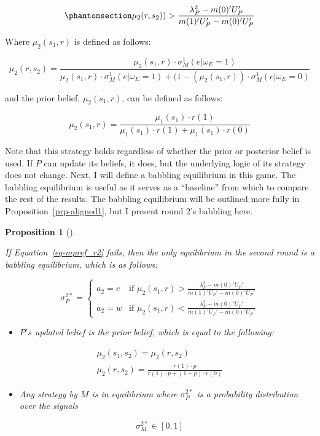 \documentclass[
  12pt,
]{article}
\providecommand{\tightlist}{%
  \setlength{\itemsep}{0pt}\setlength{\parskip}{0pt}}\usepackage{longtable,booktabs,array}
\theoremstyle{plain}
\theoremstyle{plain}
\newtheorem{proposition}{Proposition}[section]
\theoremstyle{remark}
\begin{document}
\begin{equation}\phantomsection\label{eq-cutpoint2}{
\mu_2 (r, s_2)) > \frac{\lambda^2_P - m(0)' U_P '}{m(1)' U_P' - m(0)' U_P'}
}\end{equation}

Where \(\mu_2(s_1, r)\) is defined as follows:

\[
\mu_2(r, s_2)= \frac{\mu_2(s_1, r) \cdot \sigma_M^1(e|\omega_E = 1)}{\mu_2(s_1, r) \cdot \sigma_M^1(e|\omega_E = 1) + (1 - (\mu_2(s_1, r)) \cdot \sigma_M^1(e|\omega_E = 0)}
\]

and the prior belief, \(\mu_2(s_1, r)\), can be defined as follows:

\[
\mu_2(s_1, r) = \frac{\mu_1(s_1) \cdot r(1)}{\mu_1(s_1) \cdot r(1) + \mu_1(s_1) \cdot r(0)}
\]

Note that this strategy holds regardless of whether the prior or
posterior belief is used. If \(P\) can update its beliefs, it does, but
the underlying logic of its strategy does not change. Next, I will
define a babbling equilibrium in this game. The babbling equilibrium is
useful as it serves as a ``baseline'' from which to compare the rest of
the results. The babbling equilibrium will be outlined more fully in
Proposition~\ref{prp-aligned1}, but I present round 2's babbling here.

\begin{proposition}[]\protect\hypertarget{prp-unalign2}{}\label{prp-unalign2}

If Equation~\ref{eq-mpref_r2} fails, then the only equilibrium in the
second round is a babbling equilibrium, which is as follows:

\[
\sigma_P^{2*} = 
\begin{cases} 
a_2 = e & \text{if } \mu_2(s_1, r) > \frac{\lambda^2_P - m(0)' U_P '}{m(1)' U_P' - m(0)' U_P'}\\
a_2 = w & \text{if } \mu_2(s_1, r) < \frac{\lambda^2_P - m(0)' U_P '}{m(1)' U_P' - m(0)' U_P'}
\end{cases}
\]

\begin{itemize}
\tightlist
\item
  \(P's\) updated belief is the prior belief, which is equal to the
  following:
\end{itemize}

\[
\begin{aligned}
\mu_2(s_1, s_2) =  \mu_2(r, s_2)\\
\mu_2(r, s_2) =  \frac{r(1) \cdot p}{r(1) \cdot p + (1 - p) \cdot r(0)}
\end{aligned}
\]

\begin{itemize}
\tightlist
\item
  Any strategy by \(M\) is in equilibrium where \(\sigma_P^{2*}\) is a
  probability distribution over the signals
\end{itemize}

\[
\sigma_M^{2*} \in [0, 1]
\]

\end{proposition}
\end{document}
